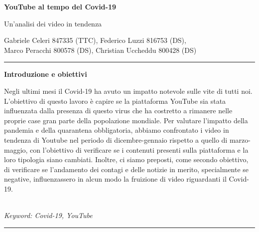 \documentclass[10pt, a4paper,openany]{article}
\begin{document}
\begin{center}
\huge\textbf{YouTube al tempo del Covid-19}

Un'analisi dei video in tendenza
\end{center}

\begin{center}
Gabriele Celeri 847335 (TTC), Federico Luzzi 816753 (DS),\\  Marco Peracchi 800578 (DS), Christian Uccheddu 800428 (DS)
\end{center}

\hrule
\vspace{0.2cm}
\begin{center}\textbf{Introduzione e obiettivi}\end{center} 
Negli ultimi mesi il Covid-19 ha avuto un impatto notevole sulle vite di tutti noi. L'obiettivo di questo lavoro è capire se la piattaforma YouTube sia stata influenzata dalla presenza di questo virus che ha costretto a rimanere nelle proprie case gran parte della popolazione mondiale. 
Per valutare l'impatto della pandemia e della quarantena obbligatoria, abbiamo confrontato i video in tendenza di Youtube nel periodo di dicembre-gennaio rispetto a quello di marzo-maggio, con l'obiettivo di verificare se i contenuti presenti sulla piattaforma e la loro tipologia siano cambiati.
Inoltre, ci siamo preposti, come secondo obiettivo, di verificare se l'andamento dei contagi e delle notizie in merito, specialmente se negative, influenzassero in alcun modo la fruizione di video riguardanti il Covid-19.
\\\\ \begin{small}
	\textit{Keyword: Covid-19, YouTube}
\end{small}
\vspace{0.2cm}
\hrule



  
\end{document}
